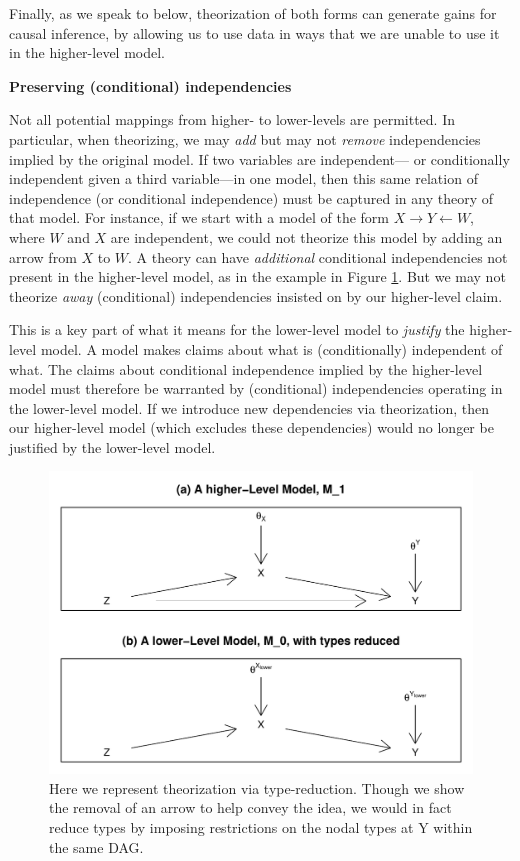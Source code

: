 \documentclass[
  12pt,
]{book}
\begin{document}
Finally, as we speak to below, theorization of both forms can generate gains for causal inference, by allowing us to use data in ways that we are unable to use it in the higher-level model.

\textbf{Preserving (conditional) independencies}

Not all potential mappings from higher- to lower-levels are permitted. In particular, when theorizing, we may \emph{add} but may not \emph{remove} independencies implied by the original model. If two variables are independent--- or conditionally independent given a third variable---in one model, then this same relation of independence (or conditional independence) must be captured in any theory of that model. For instance, if we start with a model of the form \(X \rightarrow Y \leftarrow W\), where \(W\) and \(X\) are independent, we could not theorize this model by adding an arrow from \(X\) to \(W\). A theory can have \emph{additional} conditional independencies not present in the higher-level model, as in the example in Figure \ref{fig:Highlowreduce}. But we may not theorize \emph{away} (conditional) independencies insisted on by our higher-level claim.

This is a key part of what it means for the lower-level model to \emph{justify} the higher-level model. A model makes claims about what is (conditionally) independent of what. The claims about conditional independence implied by the higher-level model must therefore be warranted by (conditional) independencies operating in the lower-level model. If we introduce new dependencies via theorization, then our higher-level model (which excludes these dependencies) would no longer be justified by the lower-level model.

\begin{figure}

{\centering \includegraphics[width=0.8\linewidth]{ii_files/figure-latex/Highlowreduce-1} 

}

\caption{Here we represent theorization via type-reduction. Though we show the removal of an arrow to help convey the idea, we would in fact reduce types by imposing restrictions on the nodal types at Y within the same DAG.}\label{fig:Highlowreduce}
\end{figure}
\end{document}
